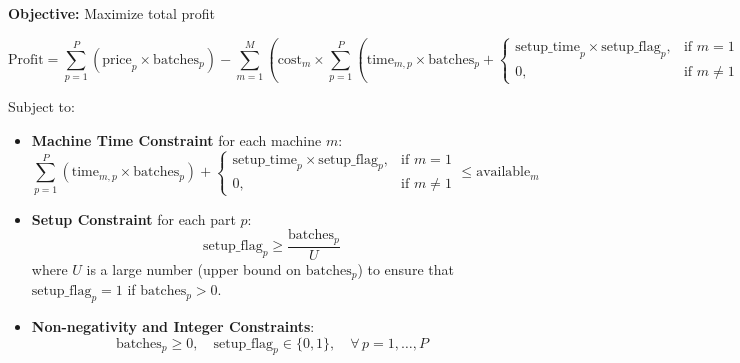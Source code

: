 \documentclass{article}
\begin{document}
\textbf{Objective:} Maximize total profit

\[
\text{Profit} = \sum_{p=1}^{P} \left( \text{price}_{p} \times \text{batches}_{p} \right) - \sum_{m=1}^{M} \left( \text{cost}_{m} \times \sum_{p=1}^{P} (\text{time}_{m,p} \times \text{batches}_{p} + 
\begin{cases} 
\text{setup\_time}_{p} \times \text{setup\_flag}_{p}, & \text{if } m = 1 \\
0, & \text{if } m \neq 1 
\end{cases}
) \right)
\]

Subject to:

\begin{itemize}
    \item \textbf{Machine Time Constraint} for each machine \( m \):
    \[
    \sum_{p=1}^{P} (\text{time}_{m,p} \times \text{batches}_{p}) + 
    \begin{cases} 
    \text{setup\_time}_{p} \times \text{setup\_flag}_{p}, & \text{if } m = 1 \\
    0, & \text{if } m \neq 1 
    \end{cases}
    \leq \text{available}_{m}
    \]

    \item \textbf{Setup Constraint} for each part \( p \):
    \[
    \text{setup\_flag}_{p} \geq \frac{\text{batches}_{p}}{U}
    \]
    where \( U \) is a large number (upper bound on \(\text{batches}_{p}\)) to ensure that \(\text{setup\_flag}_{p} = 1\) if \(\text{batches}_{p} > 0\).

    \item \textbf{Non-negativity and Integer Constraints}:
    \[
    \text{batches}_{p} \geq 0, \quad \text{setup\_flag}_{p} \in \{0, 1\}, \quad \forall \, p = 1,\ldots,P
    \]
\end{itemize}
\end{document}
